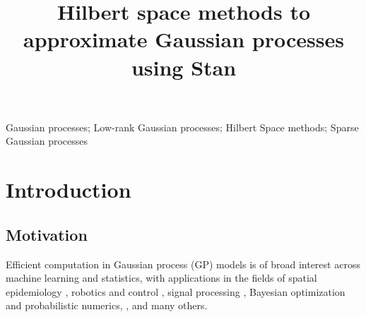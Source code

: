 \documentclass[]{interact}
\theoremstyle{plain}%
\theoremstyle{definition}
\theoremstyle{remark}
\begin{document}

\title{Hilbert space methods to approximate Gaussian processes using Stan}


\maketitle

\begin{abstract}

\end{abstract}

\begin{keywords}
Gaussian processes; Low-rank Gaussian processes; Hilbert Space methods; Sparse Gaussian processes
\end{keywords}

\tableofcontents


\newpage

\section{Introduction}\label{sec:bf_intro}

\subsection{Motivation}

Efficient computation in Gaussian process (GP) models is of broad interest across machine learning and statistics, with applications in the fields of spatial epidemiology \citep{diggle2013statistical,carlin2014hierarchical}, robotics and control \citep{deisenroth2015gaussian}, signal processing \citep{sarkka2013spatiotemporal}, Bayesian optimization and probabilistic numerics, \citep{roberts2010bayesian,briol2015probabilistic,hennig2015probabilistic} , and many others.
\end{document}
